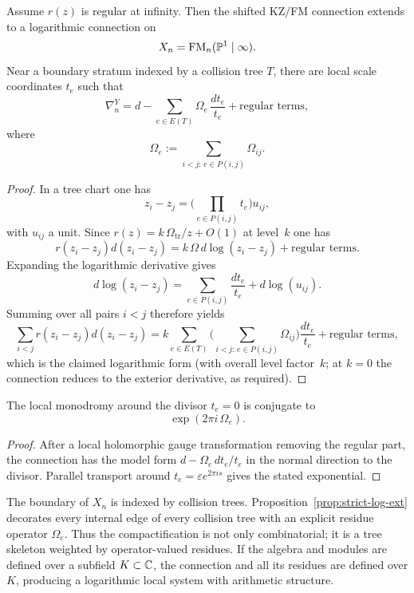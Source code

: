 \begin{proposition}%
Assume $r(z)$ is regular at infinity. Then the shifted KZ/FM connection extends to a logarithmic connection on
\[
 X_n=\mathrm{FM}_n(\mathbb P^1\mid\infty).
\]
Near a boundary stratum indexed by a collision tree $T$, there are local scale coordinates $t_e$ such that
\[
 \nabla_n^Y = d-\sum_{e\in E(T)} \Omega_e\,\frac{dt_e}{t_e}+\text{regular terms},
\]
where
\[
 \Omega_e:=\sum_{i<j:\,e\in P(i,j)}\Omega_{ij}.
\]
\end{proposition}

\begin{proof}
In a tree chart one has
\[
 z_i-z_j = \Big(\prod_{e\in P(i,j)}t_e\Big)u_{ij},
\]
with $u_{ij}$ a unit. Since $r(z)=k\,\Omega_{\mathrm{tr}}/z+O(1)$ at level~$k$ one has
\[
 r(z_i-z_j)d(z_i-z_j)=k\,\Omega\,d\log(z_i-z_j)+\text{regular terms}.
\]
Expanding the logarithmic derivative gives
\[
 d\log(z_i-z_j)=\sum_{e\in P(i,j)}\frac{dt_e}{t_e}+d\log(u_{ij}).
\]
Summing over all pairs $i<j$ therefore yields
\[
 \sum_{i<j}r(z_i-z_j)d(z_i-z_j)=k\sum_{e\in E(T)}\Big(\sum_{i<j:\,e\in P(i,j)}\Omega_{ij}\Big)\frac{dt_e}{t_e}+\text{regular terms},
\]
which is the claimed logarithmic form \textup{(}with overall level factor~$k$; at $k=0$ the connection reduces to the exterior derivative, as required\textup{)}.
\end{proof}

\begin{corollary}%
The local monodromy around the divisor $t_e=0$ is conjugate to
\[
 \exp(2\pi i\,\Omega_e).
\]
\end{corollary}

\begin{proof}
After a local holomorphic gauge transformation removing the regular part, the connection has the model form $d-\Omega_e\,dt_e/t_e$ in the normal direction to the divisor. Parallel transport around $t_e=\varepsilon e^{2\pi i s}$ gives the stated exponential.
\end{proof}

\begin{remark}
The boundary of $X_n$ is indexed by collision trees. Proposition~\ref{prop:strict-log-ext} decorates every internal edge of every collision tree with an explicit residue operator $\Omega_e$. Thus the compactification is not only combinatorial; it is a tree skeleton weighted by operator-valued residues. If the algebra and modules are defined over a subfield $K\subset\mathbb C$, the connection and all its residues are defined over $K$, producing a logarithmic local system with arithmetic structure.
\end{remark}

